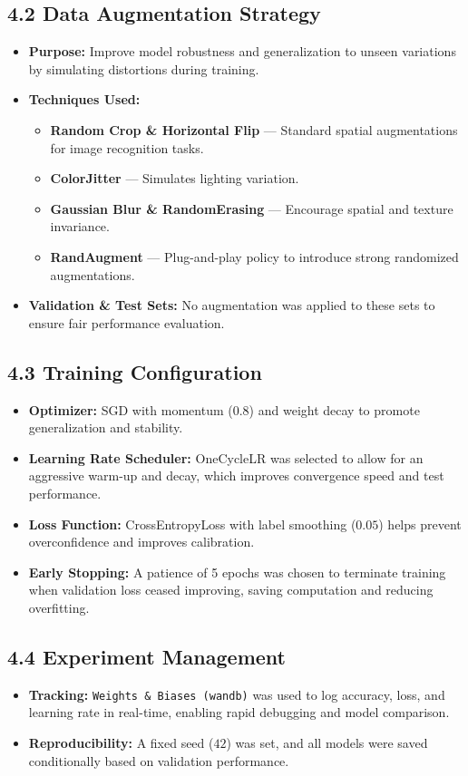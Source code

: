 \documentclass{article}
\begin{document}
\subsection*{4.2 Data Augmentation Strategy}
\begin{itemize}
    \item \textbf{Purpose:} Improve model robustness and generalization to unseen variations by simulating distortions during training.
    \item \textbf{Techniques Used:}
    \begin{itemize}
        \item \textbf{Random Crop \& Horizontal Flip} — Standard spatial augmentations for image recognition tasks.
        \item \textbf{ColorJitter} — Simulates lighting variation.
        \item \textbf{Gaussian Blur \& RandomErasing} — Encourage spatial and texture invariance.
        \item \textbf{RandAugment} — Plug-and-play policy to introduce strong randomized augmentations.
    \end{itemize}
    \item \textbf{Validation \& Test Sets:} No augmentation was applied to these sets to ensure fair performance evaluation.
\end{itemize}

\subsection*{4.3 Training Configuration}
\begin{itemize}
    \item \textbf{Optimizer:} SGD with momentum ($0.8$) and weight decay to promote generalization and stability.
    \item \textbf{Learning Rate Scheduler:} OneCycleLR was selected to allow for an aggressive warm-up and decay, which improves convergence speed and test performance.
    \item \textbf{Loss Function:} CrossEntropyLoss with label smoothing ($0.05$) helps prevent overconfidence and improves calibration.
    \item \textbf{Early Stopping:} A patience of 5 epochs was chosen to terminate training when validation loss ceased improving, saving computation and reducing overfitting.
\end{itemize}

\subsection*{4.4 Experiment Management}
\begin{itemize}
    \item \textbf{Tracking:} \texttt{Weights \& Biases (wandb)} was used to log accuracy, loss, and learning rate in real-time, enabling rapid debugging and model comparison.
    \item \textbf{Reproducibility:} A fixed seed ($42$) was set, and all models were saved conditionally based on validation performance.
\end{itemize}
\end{document}
